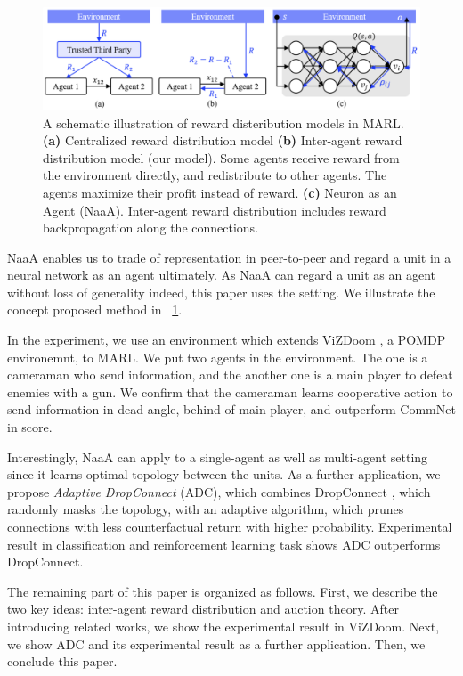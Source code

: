 \begin{figure}[tb]
	\centering
	\includegraphics[width=\linewidth]{img/TTP.eps}
	\caption{
		A schematic illustration of reward disteribution models in MARL.
		{\bf (a)} Centralized reward distribution model \citep{agogino2006quicr,sukhbaatar2016learning,foerster2016learning,foerster2017counterfactual}
		{\bf (b)} Inter-agent reward distribution model (our model). Some agents receive reward from the environment directly,  
			and redistribute to other agents. The agents maximize their profit instead of reward.
		{\bf (c)} Neuron as an Agent (NaaA). Inter-agent reward distribution includes reward backpropagation along the connections. 
	}
	\label{fig:ttp}
\end{figure}

NaaA enables us to trade of representation in peer-to-peer and regard a unit in a neural network as an agent ultimately.
As NaaA can regard a unit as an agent without loss of generality indeed, this paper uses the setting.
We illustrate the concept proposed method in \figurename~\ref{fig:ttp}.

In the experiment, we use an environment which extends ViZDoom \citep{kempka2016vizdoom}, a POMDP environemnt, to MARL.
We put two agents in the environment.
The one is a cameraman who send information, and the another one is a main player to defeat enemies with a gun.
We confirm that the cameraman learns cooperative action to send information in dead angle, behind of main player, and outperform CommNet in score.

Interestingly, NaaA can apply to a single-agent as well as multi-agent setting since it learns optimal topology between the units. %
As a further application, we propose {\em Adaptive DropConnect} (ADC), which combines DropConnect \citep{wan2013regularization}, which randomly masks the topology, with an adaptive algorithm, which prunes connections with less counterfactual return with higher probability.
Experimental result in classification and reinforcement learning task shows ADC outperforms DropConnect.

The remaining part of this paper is organized as follows. 
First, we describe the two key ideas: inter-agent reward distribution and auction theory. 
After introducing related works, we show the experimental result in ViZDoom.
Next, we show ADC and its experimental result as a further application. 
Then, we conclude this paper.
